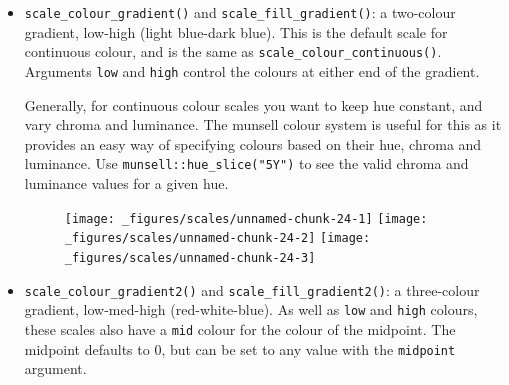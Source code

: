 \begin{itemize}
\item
  \texttt{scale\_colour\_gradient()} and
  \texttt{scale\_fill\_gradient()}: a two-colour gradient, low-high
  (light blue-dark blue). This is the default scale for continuous
  colour, and is the same as \texttt{scale\_colour\_continuous()}.
  Arguments \texttt{low} and \texttt{high} control the colours at either
  end of the gradient. 

  Generally, for continuous colour scales you want to keep hue constant,
  and vary chroma and luminance. The munsell colour system is useful for
  this as it provides an easy way of specifying colours based on their
  hue, chroma and luminance. Use \texttt{munsell::hue\_slice("5Y")} to
  see the valid chroma and luminance values for a given hue.

\begin{Shaded}
\begin{Highlighting}[]

\StringTok{ }\NormalTok{(} \NormalTok{, } \NormalTok{)}

\StringTok{ }\NormalTok{(}
   \NormalTok{(}\NormalTok{), }
   \NormalTok{(}\NormalTok{)}
\NormalTok{)}
\end{Highlighting}
\end{Shaded}

  \begin{figure}[H]
    \texttt{[image: \_figures/scales/unnamed-chunk-24-1]}%
    \texttt{[image: \_figures/scales/unnamed-chunk-24-2]}%
    \texttt{[image: \_figures/scales/unnamed-chunk-24-3]}
  \end{figure}
\item
  \texttt{scale\_colour\_gradient2()} and
  \texttt{scale\_fill\_gradient2()}: a three-colour gradient,
  low-med-high (red-white-blue). As well as \texttt{low} and
  \texttt{high} colours, these scales also have a \texttt{mid} colour
  for the colour of the midpoint. The midpoint defaults to 0, but can be
  set to any value with the \texttt{midpoint} argument.
   


\end{itemize}
